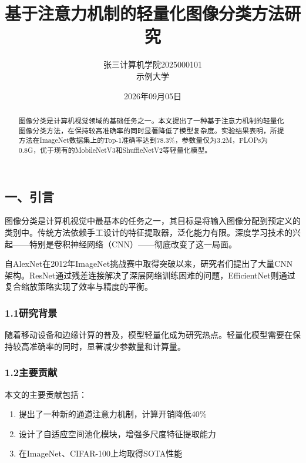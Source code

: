 \documentclass{harryopo-paper}
\title{基于注意力机制的轻量化图像分类方法研究}
\author{张三计算机学院2025000101\\ \fzfs\small 示例大学}
\date{2026年09月05日}
\begin{document}
\maketitle
\begin{abstract}
图像分类是计算机视觉领域的基础任务之一。本文提出了一种基于注意力机制的轻量化图像分类方法，在保持较高准确率的同时显著降低了模型复杂度。实验结果表明，所提方法在ImageNet数据集上的Top-1准确率达到78.3\%，参数量仅为3.2M，FLOPs为0.8G，优于现有的MobileNetV3和ShuffleNetV2等轻量化模型。
\end{abstract}

\subsection*{一、引言}

图像分类是计算机视觉中最基本的任务之一，其目标是将输入图像分配到预定义的类别中。传统方法依赖手工设计的特征提取器，泛化能力有限。深度学习技术的兴起——特别是卷积神经网络（CNN）——彻底改变了这一局面。

自AlexNet在2012年ImageNet挑战赛中取得突破以来，研究者们提出了大量CNN架构。ResNet通过残差连接解决了深层网络训练困难的问题，EfficientNet则通过复合缩放策略实现了效率与精度的平衡。

\subsubsection*{1.1研究背景}

随着移动设备和边缘计算的普及，模型轻量化成为研究热点。轻量化模型需要在保持较高准确率的同时，显著减少参数量和计算量。

\subsubsection*{1.2主要贡献}

本文的主要贡献包括：

\begin{enumerate}
  \item 提出了一种新的通道注意力机制，{\fzht 计算开销降低40\%}
  \item 设计了自适应空间池化模块，增强多尺度特征提取能力
  \item 在ImageNet、CIFAR-100上均取得SOTA性能
\end{enumerate}
\end{document}
